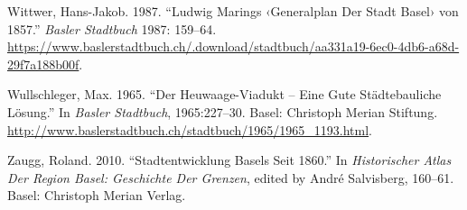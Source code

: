\documentclass[
  letterpaper,
  DIV=11,
  numbers=noendperiod]{scrartcl}
\newlength{\cslhangindent}
\newenvironment{CSLReferences}[2] %
 {\begin{list}{}{%
  \setlength{\itemindent}{0pt}
  \setlength{\leftmargin}{0pt}
  \setlength{\parsep}{0pt}
  \ifodd #1
   \setlength{\leftmargin}{\cslhangindent}
   \setlength{\itemindent}{-1\cslhangindent}
  \fi
  \setlength{\itemsep}{#2\baselineskip}}}
 {\end{list}}
\begin{document}
\begin{CSLReferences}{1}{0}
Wittwer, Hans-Jakob. 1987. {``Ludwig {Marings} ‹{Generalplan} Der
{Stadt} {Basel}› von 1857.''} \emph{Basler Stadtbuch} 1987: 159--64.
\url{https://www.baslerstadtbuch.ch/.download/stadtbuch/aa331a19-6ec0-4db6-a68d-29f7a188b00f}.

Wullschleger, Max. 1965. {``Der {Heuwaage}-{Viadukt} -- Eine Gute
Städtebauliche {Lösung}.''} In \emph{Basler {Stadtbuch}}, 1965:227--30.
Basel: Christoph Merian Stiftung.
\url{http://www.baslerstadtbuch.ch/stadtbuch/1965/1965_1193.html}.

Zaugg, Roland. 2010. {``Stadtentwicklung {Basels} Seit 1860.''} In
\emph{Historischer {Atlas} Der {Region} {Basel}: {Geschichte} Der
{Grenzen}}, edited by André Salvisberg, 160--61. Basel: Christoph Merian
Verlag.

\end{CSLReferences}
\end{document}
